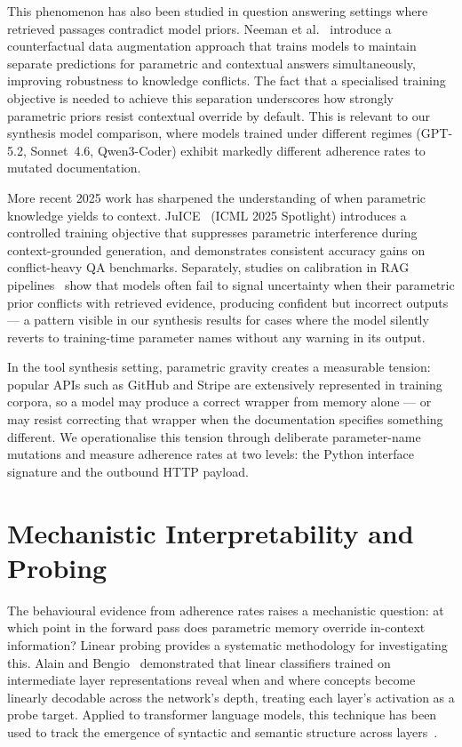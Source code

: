 \documentclass[12pt]{report}
\begin{document}
This phenomenon has also been studied in question answering settings where
retrieved passages contradict model priors. Neeman et al.~\cite{neeman2022disentqa}
introduce a counterfactual data augmentation approach that trains models to
maintain separate predictions for parametric and contextual answers
simultaneously, improving robustness to knowledge conflicts. The fact that
a specialised training objective is needed to achieve this separation
underscores how strongly parametric priors resist contextual override by
default. This is relevant to our synthesis model comparison, where models
trained under different regimes (GPT-5.2, Sonnet~4.6, Qwen3-Coder) exhibit
markedly different adherence rates to mutated documentation.

More recent 2025 work has sharpened the understanding of when parametric
knowledge yields to context. JuICE~\cite{juice2025} (ICML 2025 Spotlight)
introduces a controlled training objective that suppresses parametric
interference during context-grounded generation, and demonstrates consistent
accuracy gains on conflict-heavy QA benchmarks. Separately, studies on
calibration in RAG pipelines~\cite{ragknowswrong2025} show that models often
fail to signal uncertainty when their parametric prior conflicts with
retrieved evidence, producing confident but incorrect outputs --- a pattern
visible in our synthesis results for cases where the model silently reverts
to training-time parameter names without any warning in its output.

In the tool synthesis setting, parametric gravity creates a measurable
tension: popular APIs such as GitHub and Stripe are extensively represented
in training corpora, so a model may produce a correct wrapper from memory
alone --- or may resist correcting that wrapper when the documentation
specifies something different. We operationalise this tension through
deliberate parameter-name mutations and measure adherence rates at two
levels: the Python interface signature and the outbound HTTP payload.

\section{Mechanistic Interpretability and Probing}

The behavioural evidence from adherence rates raises a mechanistic question:
at which point in the forward pass does parametric memory override in-context
information? Linear probing provides a systematic methodology for
investigating this. Alain and Bengio~\cite{alain2017understanding} demonstrated
that linear classifiers trained on intermediate layer representations reveal
when and where concepts become linearly decodable across the network's depth,
treating each layer's activation as a probe target. Applied to transformer
language models, this technique has been used to track the emergence of
syntactic and semantic structure across layers~\cite{tenney2019bert}.
\end{document}
